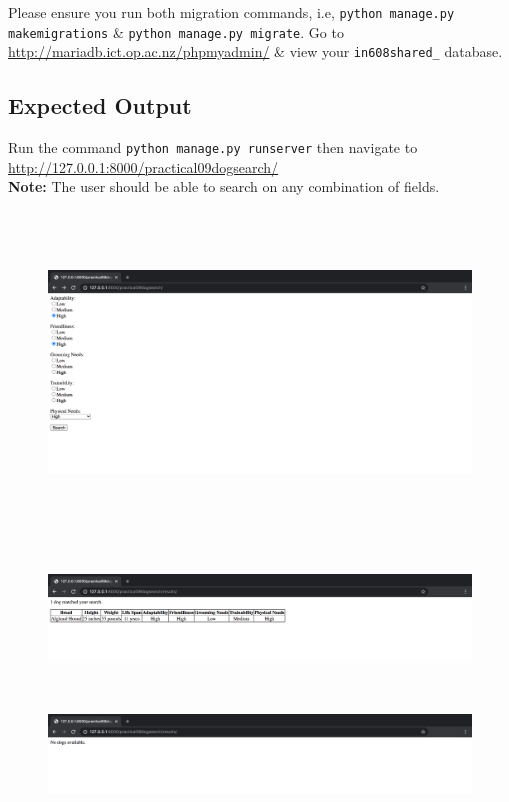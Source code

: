 \documentclass{article}
\begin{document}
Please ensure you run both migration commands, i.e, \texttt{python manage.py makemigrations} \& \texttt{python manage.py migrate}. Go to \href{http://mariadb.ict.op.ac.nz/phpmyadmin/}{http://mariadb.ict.op.ac.nz/phpmyadmin/} \& view your \texttt{in608shared\_<your OP username>} database.

\subsection*{Expected Output} 
Run the command \texttt{python manage.py runserver} then navigate to \href{http://127.0.0.1:8000/practical09dogsearch/}{http://127.0.0.1:8000/practical09dogsearch/} \\

\textbf{Note:} The user should be able to search on any combination of fields.

\begin{figure}[H]
  \includegraphics[width=175mm, height=85mm]{./img/09-expected-dog-selector-1.png}
\end{figure}

\begin{figure}[H]
  \includegraphics[width=175mm, height=35mm]{./img/09-expected-dog-selector-2.png}
  \includegraphics[width=175mm, height=35mm]{./img/09-expected-dog-selector-3.png}
\end{figure}
\end{document}
